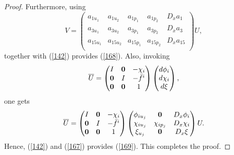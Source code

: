\documentclass[12pt]{article}
\begin{document}
\begin{proof}
 Furthermore, using 
\begin{equation}
V=\begin{pmatrix}
a_{1u_1}&a_{1u_2}&a_{1p_1}&a_{1p_2}&D_xa_1\\
a_{3u_1}&a_{3u_2}&a_{3p_1}&a_{3p_2}&D_xa_3\\
a_{15u_1}&a_{15u_2}&a_{15p_1}&a_{15p_2}&D_xa_{15}\\
\end{pmatrix}U,
\end{equation}
together with (\ref{142}) provides (\ref{168}). 
Also, invoking
\begin{equation}
\overline{\vphantom{x}U}=\begin{pmatrix}
I&\textbf{0}&-\chi_i\\
\textbf{0}&I&-\bar{f}^i\\
\textbf{0}&\textbf{0}&1\\
\end{pmatrix}\begin{pmatrix}
d\phi_i\\
d\chi_i\\
d\xi
\end{pmatrix},
\end{equation}
one gets
\begin{equation}\label{167}
\overline{\vphantom{x}U}=\begin{pmatrix}
I&\textbf{0}&-\chi_i\\
\textbf{0}&I&-\bar{f}^i\\
\textbf{0}&\textbf{0}&1\\
\end{pmatrix}\begin{pmatrix}
\phi_{iu_j}&\textbf{0}&D_x\phi_i\\
\chi_{iu_j}&\chi_{ip_j}&D_x\chi_i\\
\xi_{u_j}&\textbf{0}&D_x\xi
\end{pmatrix}U.
\end{equation}
Hence, (\ref{142}) and (\ref{167}) provides (\ref{169}). 
This completes the proof.
\end{proof}
\vspace{0.5cm}
\end{document}
